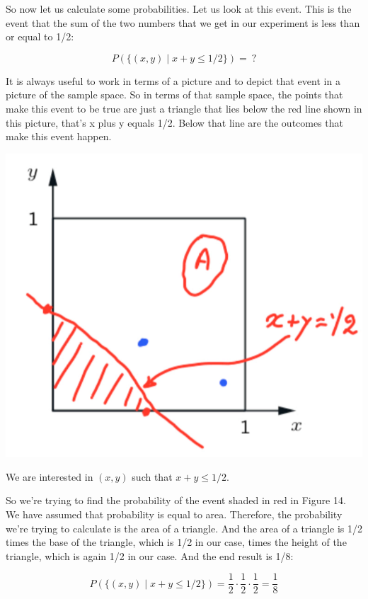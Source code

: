 \documentclass{tufte-handout}
\begin{document}
So now let us calculate some probabilities. Let us look at this event. This is the event that the sum of
the two numbers that we get in our experiment is less than or equal to 1/2: 

$$
P\left(  \{(x, y) \mid x + y \leq 1/2   \}   \right) = \ ?
$$

It is always useful to work in
terms of a picture and to depict that event in a picture of the sample space. So in terms of that sample
space, the points that make this event to be true are just a triangle that lies below the red line shown in
this picture, that's x plus y equals 1/2. Below that line are the outcomes that make this
event happen.

\begin{marginfigure}
  \includegraphics{ContSampleSpace1}
  \caption{We are interested in $(x, y)$ such that $x + y \leq 1/2$.}
\end{marginfigure}

So we're trying to find the probability of the event shaded in red in Figure 14. We have assumed that probability is equal to
area. Therefore, the probability we're trying to calculate is the area of a triangle. And the area of a
triangle is 1/2 times the base of the triangle, which is 1/2 in our case, times the height of the triangle,
which is again 1/2 in our case. And the end result is 1/8:

$$
P\left(  \{(x, y) \mid x + y \leq 1/2   \}   \right) = \frac{1}{2} \cdot \frac{1}{2} \cdot \frac{1}{2} = \frac{1}{8} 
$$
\end{document}
